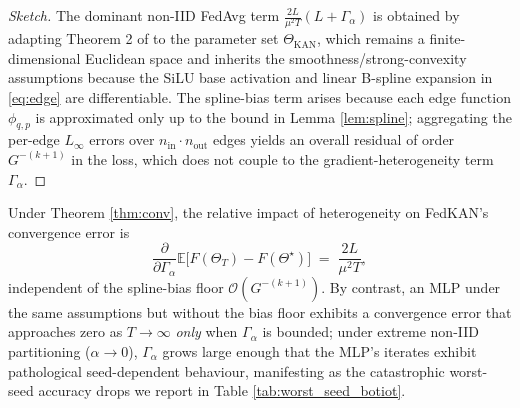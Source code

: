 \begin{proof}[Sketch]
The dominant non-IID FedAvg term $\frac{2L}{\mu^2 T}(L+\Gamma_\alpha)$ is obtained by adapting Theorem 2 of \cite{li2020convergence} to the parameter set $\Theta_{\text{KAN}}$, which remains a finite-dimensional Euclidean space and inherits the smoothness/strong-convexity assumptions because the SiLU base activation and linear B-spline expansion in \eqref{eq:edge} are differentiable. The spline-bias term arises because each edge function $\phi_{q,p}$ is approximated only up to the bound in Lemma \ref{lem:spline}; aggregating the per-edge $L_\infty$ errors over $n_{\text{in}}\cdot n_{\text{out}}$ edges yields an overall residual of order $G^{-(k+1)}$ in the loss, which does not couple to the gradient-heterogeneity term $\Gamma_\alpha$.
\end{proof}

\begin{corollary}\label{cor:robust}
Under Theorem \ref{thm:conv}, the relative impact of heterogeneity on FedKAN's convergence error is
\begin{equation}
\frac{\partial}{\partial \Gamma_\alpha} \mathbb{E}\big[F(\Theta_T) - F(\Theta^\star)\big] \;=\; \frac{2L}{\mu^2 T},
\end{equation}
independent of the spline-bias floor $\mathcal{O}(G^{-(k+1)})$. By contrast, an MLP under the same assumptions but without the bias floor exhibits a convergence error that approaches zero as $T \to \infty$ \emph{only} when $\Gamma_\alpha$ is bounded; under extreme non-IID partitioning ($\alpha \to 0$), $\Gamma_\alpha$ grows large enough that the MLP's iterates exhibit pathological seed-dependent behaviour, manifesting as the catastrophic worst-seed accuracy drops we report in Table \ref{tab:worst_seed_botiot}.
\end{corollary}
